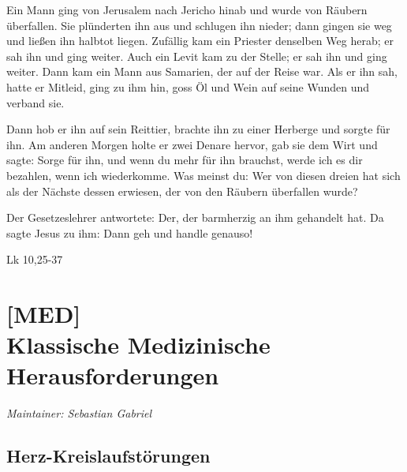 \begin{savequote}
{\tiny Ein Mann ging von Jerusalem nach Jericho hinab und wurde von
Räubern überfallen. Sie plünderten ihn aus und schlugen ihn nieder; dann gingen sie weg und ließen ihn 
halbtot liegen. Zufällig kam ein Priester denselben Weg
herab; er sah ihn und ging weiter. Auch ein Levit kam zu
der  Stelle; er sah ihn und ging weiter. Dann kam ein Mann
aus  Samarien, der auf der Reise war. Als er ihn sah, hatte
er  Mitleid, ging zu ihm hin, goss Öl und Wein auf seine
Wunden  und verband sie. 

Dann hob er ihn auf sein Reittier,
brachte  ihn zu einer Herberge und sorgte für ihn. Am
anderen Morgen  holte er zwei Denare hervor, gab sie dem
Wirt und sagte:  Sorge für ihn, und wenn du mehr für ihn
brauchst, werde  ich es dir bezahlen, wenn ich wiederkomme.
Was meinst du:  Wer von diesen dreien hat sich als der
Nächste dessen erwiesen,  der von den Räubern überfallen
wurde?  

Der Gesetzeslehrer antwortete: Der, der
barmherzig an  ihm gehandelt hat. Da
sagte Jesus zu ihm: Dann geh und handle genauso!

Lk 10,25-37}
\end{savequote}

\chapter[{[MED]} Klassische Medizinische Herausforderungen]
{[MED]\\Klassische Medizinische Herausforderungen}
\label{chp:MED}

\emph{Maintainer: Sebastian Gabriel}

\minitoc


% 
% 
% 




\clearpage
\section{Herz-Kreislaufstörungen}


\label{sec:herz-kreislauf-stoerungen}
\label{topic:herz-kreislauf-stoerungen}

